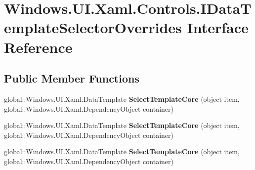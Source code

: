 \hypertarget{interface_windows_1_1_u_i_1_1_xaml_1_1_controls_1_1_i_data_template_selector_overrides}{}\section{Windows.\+U\+I.\+Xaml.\+Controls.\+I\+Data\+Template\+Selector\+Overrides Interface Reference}
\label{interface_windows_1_1_u_i_1_1_xaml_1_1_controls_1_1_i_data_template_selector_overrides}
\subsection*{Public Member Functions}
\begin{DoxyCompactItemize}
\item 
\mbox{\label{interface_windows_1_1_u_i_1_1_xaml_1_1_controls_1_1_i_data_template_selector_overrides_a39cd4183f114ebf8c384485efdcf11ee}} 
global\+::\+Windows.\+U\+I.\+Xaml.\+Data\+Template {\bfseries Select\+Template\+Core} (object item, global\+::\+Windows.\+U\+I.\+Xaml.\+Dependency\+Object container)
\item 
\mbox{\label{interface_windows_1_1_u_i_1_1_xaml_1_1_controls_1_1_i_data_template_selector_overrides_a39cd4183f114ebf8c384485efdcf11ee}} 
global\+::\+Windows.\+U\+I.\+Xaml.\+Data\+Template {\bfseries Select\+Template\+Core} (object item, global\+::\+Windows.\+U\+I.\+Xaml.\+Dependency\+Object container)
\item 
\mbox{\label{interface_windows_1_1_u_i_1_1_xaml_1_1_controls_1_1_i_data_template_selector_overrides_a39cd4183f114ebf8c384485efdcf11ee}} 
global\+::\+Windows.\+U\+I.\+Xaml.\+Data\+Template {\bfseries Select\+Template\+Core} (object item, global\+::\+Windows.\+U\+I.\+Xaml.\+Dependency\+Object container)
\item 
\mbox{\label{interface_windows_1_1_u_i_1_1_xaml_1_1_controls_1_1_i_data_template_selector_overrides_a39cd4183f114ebf8c384485efdcf11ee}} 

\end{DoxyCompactItemize}
